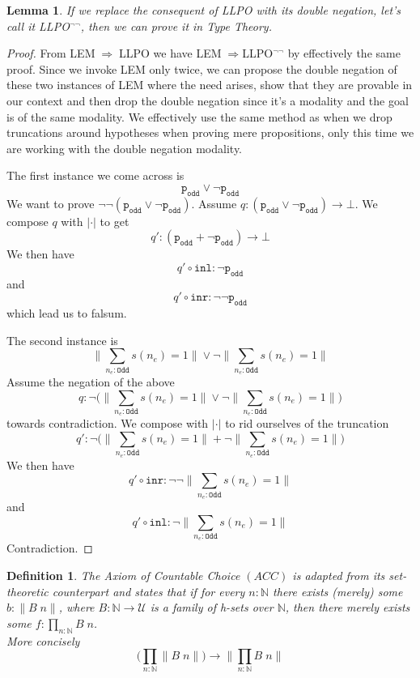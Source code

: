 \documentclass[12pt]{report}
\newtheorem{defn}[thm]{Definition}
\newtheorem{lem}[thm]{Lemma}
\begin{document}
\begin{lem}\label{llponeg}
If we replace the consequent of LLPO with its double negation, let's call it LLPO$^{\neg\neg}$, then we can prove it in Type Theory. 
\end{lem}
\begin{proof}
From LEM$\;\Rightarrow\;$LLPO we have LEM$\;\Rightarrow$LLPO$^{\neg\neg}$ by effectively the same proof. 
Since we invoke LEM only twice, we can propose the double negation of these two instances of LEM where the need arises, show that they are provable in our context and then drop the double negation since it's a modality and the goal is of the same modality. 
We effectively use the same method as when we drop truncations around hypotheses when proving mere propositions, only this time we are working with the double negation modality. 

The first instance we come across is $$\mathtt{p_{odd}} \vee \neg \mathtt{p_{odd}}$$
We want to prove $\neg \neg (\mathtt{p_{odd}} \vee \neg \mathtt{p_{odd}})$. 
Assume $q: (\mathtt{p_{odd}} \vee \neg \mathtt{p_{odd}}) \rightarrow \bot$. 
We compose $q$ with $|\cdot|$ to get 
$$q': (\mathtt{p_{odd}} + \neg \mathtt{p_{odd}}) \rightarrow \bot$$
We then have 
$$q' \circ \mathtt{inl} : \neg\mathtt{p_{odd}}$$
and
$$q' \circ \mathtt{inr} : \neg\neg \mathtt{p_{odd}}$$
which lead us to falsum.

The second instance is 
$$\Big\lVert\sum_{n_e : \mathtt{Odd}}s(n_e)=1 \Big\rVert \vee \neg \Big\lVert\sum_{n_e : \mathtt{Odd}}s(n_e)=1 \Big\rVert$$
Assume the negation of the above 
$$q : \neg \bigg(\Big\lVert\sum_{n_e : \mathtt{Odd}}s(n_e)=1 \Big\rVert \vee \neg \Big\lVert\sum_{n_e : \mathtt{Odd}}s(n_e)=1 \Big\rVert\bigg)$$
towards contradiction. 
We compose with $|\cdot|$ to rid ourselves of the truncation
$$q' : \neg \bigg(\Big\lVert\sum_{n_e : \mathtt{Odd}}s(n_e)=1 \Big\rVert + \neg \Big\lVert\sum_{n_e : \mathtt{Odd}}s(n_e)=1 \Big\rVert\bigg)$$
We then have
$$q' \circ \mathtt{inr} : \neg \neg \Big\lVert\sum_{n_e : \mathtt{Odd}}s(n_e)=1 \Big\rVert$$
and
$$q' \circ \mathtt{inl} : \neg \Big\lVert\sum_{n_e : \mathtt{Odd}}s(n_e)=1 \Big\rVert$$
Contradiction.
\end{proof}

\begin{defn}
The Axiom of Countable Choice $(ACC)$ is adapted from its set-theoretic counterpart and states that if for every $n : \mathbb{N}$ there exists (merely) some $b : \lVert B\; n \rVert$, where $B : \mathbb{N} \rightarrow \mathcal{U}$ is a family of h-sets over $\mathbb{N}$, then there merely exists some $f : \prod_{n : \mathbb{N}} B\; n$.\\
More concisely
$$\Big(\prod_{n : \mathbb{N}} \big\lVert B\; n \big\rVert\Big) \rightarrow \Big\lVert \prod_{n : \mathbb{N}} B\; n \Big\rVert$$
\end{defn}
\end{document}
